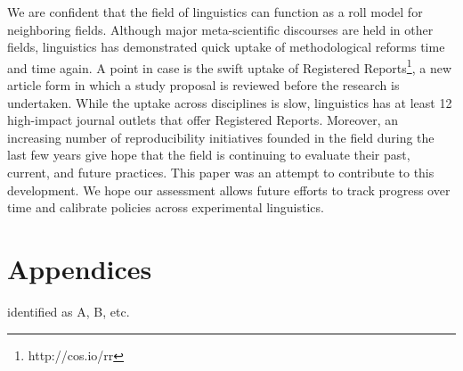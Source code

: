 \documentclass[]{elsarticle} %
\begin{document}
We are confident that the field of linguistics can function as a roll model for neighboring fields. Although major meta-scientific discourses are held in other fields, linguistics has demonstrated quick uptake of methodological reforms time and time again. A point in case is the swift uptake of Registered Reports\footnote{http://cos.io/rr}, a new article form in which a study proposal is reviewed before the research is undertaken. While the uptake across disciplines is slow, linguistics has at least 12 high-impact journal outlets that offer Registered Reports. Moreover, an increasing number of reproducibility initiatives founded in the field during the last few years give hope that the field is continuing to evaluate their past, current, and future practices. This paper was an attempt to contribute to this development. We hope our assessment allows future efforts to track progress over time and calibrate policies across experimental linguistics.

\hypertarget{appendices}{%
\section{Appendices}\label{appendices}}

identified as A, B, etc.
\end{document}

